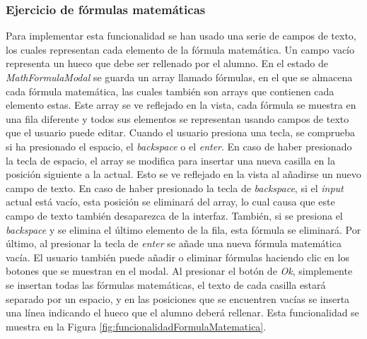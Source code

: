 \subsubsection{Ejercicio de fórmulas matemáticas}
\label{sec:impmatematica}
Para implementar esta funcionalidad se han usado una serie de campos de texto, los cuales representan cada elemento de la fórmula matemática. Un campo vacío representa un hueco que debe ser rellenado por el alumno. En el estado de \textit{MathFormulaModal} se guarda un array llamado fórmulas, en el que se almacena cada fórmula matemática, las cuales también son arrays que contienen cada elemento estas. Este array se ve reflejado en la vista, cada fórmula se muestra en una fila diferente y todos sus elementos se representan usando campos de texto que el usuario puede editar.
Cuando el usuario presiona una tecla, se comprueba si ha presionado el espacio, el \textit{backspace} o el \textit{enter}. En caso de haber presionado la tecla de espacio, el array se modifica para insertar una nueva casilla en la posición siguiente a la actual. Esto se ve reflejado en la vista al añadirse un nuevo campo de texto. En caso de haber presionado la tecla de \textit{backspace}, si el \textit{input} actual está vacío, esta posición se eliminará del array, lo cual causa que este campo de texto también desaparezca de la interfaz. También, si se presiona el \textit{backspace} y se elimina el último elemento de la fila, esta fórmula se eliminará. Por último, al presionar la tecla de \textit{enter} se añade una nueva fórmula matemática vacía. El usuario también puede añadir o eliminar fórmulas haciendo clic en los botones que se muestran en el modal.
Al presionar el botón de \textit{Ok}, simplemente se insertan todas las fórmulas matemáticas, el texto de cada casilla estará separado por un espacio, y en las posiciones que se encuentren vacías se inserta una línea indicando el hueco que el alumno deberá rellenar. Esta funcionalidad se muestra en la Figura \ref{fig:funcionalidadFormulaMatematica}.


